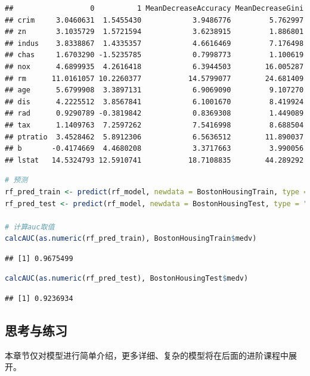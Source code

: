 \documentclass[]{ctexbook}
\begin{document}
\begin{lstlisting}
##                  0          1 MeanDecreaseAccuracy MeanDecreaseGini
## crim     3.0460631  1.5455430            3.9486776         5.762997
## zn       3.1035729  1.5721594            3.6238915         1.886801
## indus    3.8338867  1.4335357            4.6616469         7.176498
## chas     1.6703290 -1.5235785            0.7998773         1.100619
## nox      4.6899935  4.2616418            6.3944503        16.005287
## rm      11.0161057 10.2260377           14.5799077        24.681409
## age      5.6799908  3.3897131            6.9069090         9.107270
## dis      4.2225512  3.8567841            6.1001670         8.419924
## rad      0.9290789 -0.3819842            0.8369308         1.449089
## tax      1.1409763  7.2597262            7.5416998         8.688504
## ptratio  3.4528462  5.8912306            6.5636512        11.890037
## b       -0.4174669  4.4680208            3.3717663         3.990056
## lstat   14.5324793 12.5910741           18.7108835        44.289292
\end{lstlisting}

\begin{lstlisting}[language=R]
# 预测
rf_pred_train <- predict(rf_model, newdata = BostonHousingTrain, type = "class")
rf_pred_test <- predict(rf_model, newdata = BostonHousingTest, type = "class")

# 计算auc取值
calcAUC(as.numeric(rf_pred_train), BostonHousingTrain$medv)
\end{lstlisting}

\begin{lstlisting}
## [1] 0.9675499
\end{lstlisting}

\begin{lstlisting}[language=R]
calcAUC(as.numeric(rf_pred_test), BostonHousingTest$medv)
\end{lstlisting}

\begin{lstlisting}
## [1] 0.9236934
\end{lstlisting}

\hypertarget{ux601dux8003ux4e0eux7ec3ux4e60-1}{%
\subsection*{思考与练习}\label{ux601dux8003ux4e0eux7ec3ux4e60-1}}


本章节仅对模型进行简单介绍，更多详细、复杂的模型将在后面的进阶课程中展开。
\end{document}
